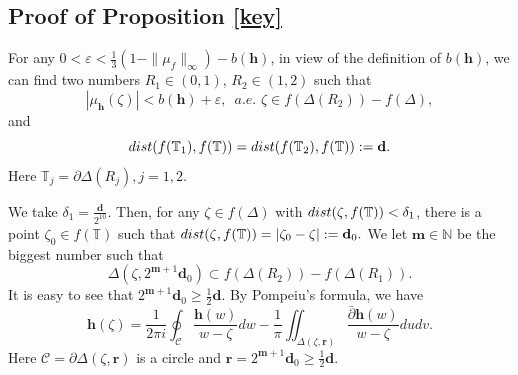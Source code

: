 \documentclass[11pt]{amsart}
\theoremstyle{remark}
\theoremstyle{claim}
\theoremstyle{definition}
\theoremstyle{problem}
\theoremstyle{conjecture}
\theoremstyle{question}
\numberwithin{equation}{section}
\begin{document}
\subsection{Proof of Proposition \ref{key}}
For any $0<\varepsilon <\frac{1}{3}(1-\|\mu_f\|_{\infty})-b(\mathbf{h})$,  in view of the definition of $b(\mathbf{h})$, we can find two numbers $R_1\in (0,1)$, $R_2\in (1,2)$ such that
\begin{equation}|\mu_{\mathbf{h}}(\zeta)|<b(\mathbf{h})+\varepsilon,\,\,\, a.e. \,\, \zeta \in f(\Delta(R_2))- f(\Delta),\nonumber \end{equation}
and
\begin{equation}
{\textup{dist}}(f(\mathbb{T}_1), f(\mathbb{T}))= {\textup{dist}}(f(\mathbb{T}_2), f(\mathbb{T})):=\mathbf{d}. \nonumber
\end{equation}
Here $\mathbb{T}_j=\partial \Delta(R_j), j=1,2.$

We take $\delta_1= \frac{\mathbf{d}}{2^{10}}.$  Then, for any $\zeta\in f(\Delta)$ with ${\textup{dist}}(\zeta, f(\mathbb{T}))<\delta_1$, there is a point $\zeta_0\in f(\mathbb{T})$ such that
${\textup{dist}}(\zeta, f(\mathbb{T}))=|\zeta_0-\zeta|:=\mathbf{d}_0.$ We let $\mathbf{m}\in \mathbb{N}$ be the biggest number such that
\begin{equation}
\Delta(\zeta, 2^{\mathbf{m}+1}\mathbf{d}_0) \subset  f(\Delta(R_2))-f(\Delta(R_1)). \nonumber
\end{equation}
It is easy to see that $2^{\mathbf{m}+1}\mathbf{d}_0 \geq  \frac{1}{2}\mathbf{d}$. By Pompeiu's formula, we have
\begin{equation}\label{pom}\mathbf{h}(\zeta)=\frac{1}{2\pi i}\oint_{\mathcal{C}} \frac{{\mathbf{h}}(w)}{w-\zeta}dw-\frac{1}{\pi}\iint_{\Delta(\zeta, \mathbf{r})}\frac{\bar{\partial} \mathbf{h}(w)}{w-\zeta}dudv.\end{equation}
Here $\mathcal{C}=\partial{\Delta}(\zeta, \mathbf{r})$ is a circle and $\mathbf{r}=2^{\mathbf{m}+1}\mathbf{d}_0\geq\frac{1}{2}\mathbf{d}$.
\end{document}
